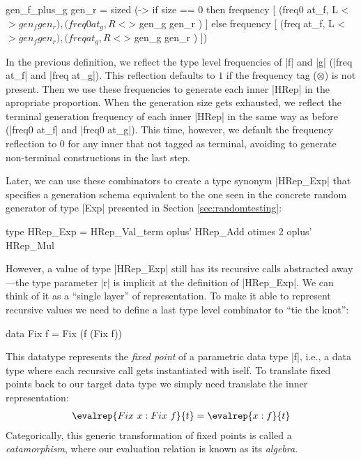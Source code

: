 \begin{code}
  gen_f_plus_g gen_r  = sized (\size ->
    if size == 0
    then frequency
      [ (freq0  at_f,  L  <$> gen_f  gen_r  )
      , (freq0  at_g,  R  <$> gen_g  gen_r  ) ]
    else frequency
      [ (freq at_f,  L  <$> gen_f  gen_r  )
      , (freq at_g,  R  <$> gen_g  gen_r  ) ])
\end{code} %

In the previous definition, we reflect the type level frequencies of |f| and |g|
(|freq at_f| and |freq at_g|).
%
This reflection defaults to $1$ if the frequency tag ($\otimes$) is not present.
%
Then we use these frequencies to generate each inner |HRep| in the apropriate
proportion.
%
When the generation size gets exhausted, we reflect the terminal generation
frequency of each inner |HRep| in the same way as before (|freq0 at_f| and
|freq0 at_g|).
%
This time, however, we default the frequency reflection to $0$ for any inner
that not tagged as terminal, avoiding to generate non-terminal constructions in
the last step.


Later, we can use these combinators to create a type synonym |HRep_Exp| that
specifies a generation schema equivalent to the one seen in the concrete random
generator of type |Exp| presented in Section \ref{sec:randomtesting}:

\begin{code}
type HRep_Exp  =       HRep_Val_term
               oplus'  HRep_Add  otimes 2
               oplus'  HRep_Mul
\end{code}

However, a value of type |HRep_Exp| still has its recursive calls abstracted
away---the type parameter |r| is implicit at the definition of |HRep_Exp|.
%
We can think of it as a ``single layer'' of representation.
%
To make it able to represent recursive values we need to define a last type
level combinator to ``tie the knot'':

\begin{code}
  data Fix f = Fix (f (Fix f))
\end{code}

This datatype represents the \emph{fixed point} of a parametric data type |f|,
i.e., a data type where each recursive call gets instantiated with iself.
%
To translate fixed points back to our target data type we simply need translate
the inner representation:
%
\begin{align*}
  \evalrep{Fix\ x : Fix\ f}{t} = \evalrep{x : f}{t}
\end{align*}
%
Categorically, this generic transformation of fixed points is called a
\emph{catamorphism}, where our evaluation relation is known as its
\emph{algebra}.


